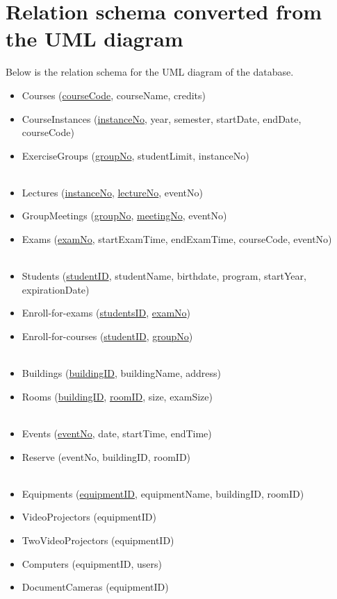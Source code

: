 \documentclass{article}
\begin{document}
\section{Relation schema converted from the UML diagram}
Below is the relation schema for the UML diagram of the database.
\begin{itemize}
	\item Courses (\underline{courseCode}, courseName, credits)
	\item CourseInstances (\underline{instanceNo}, year, semester, startDate, endDate, courseCode)
	\item ExerciseGroups (\underline{groupNo}, studentLimit, instanceNo)
	\\\\
	\item Lectures (\underline{instanceNo}, \underline{lectureNo}, eventNo)
	\item GroupMeetings (\underline{groupNo}, \underline{meetingNo}, eventNo)
	\item Exams (\underline{examNo}, startExamTime, endExamTime, courseCode, eventNo)
	\\\\
	\item Students (\underline{studentID}, studentName, birthdate, program, startYear, expirationDate)
	\item Enroll-for-exams (\underline{studentsID}, \underline{examNo})
	\item Enroll-for-courses (\underline{studentID}, \underline{groupNo})
	\\\\
	\item Buildings (\underline{buildingID}, buildingName, address)
	\item Rooms (\underline{buildingID}, \underline{roomID}, size, examSize)
	\\\\
	\item Events (\underline{eventNo}, date, startTime, endTime)
	\item Reserve (eventNo, buildingID, roomID)
	\\\\
	\item Equipments (\underline{equipmentID}, equipmentName, buildingID, roomID)
	\item VideoProjectors (equipmentID)
	\item TwoVideoProjectors (equipmentID)
	\item Computers (equipmentID, users)
	\item DocumentCameras (equipmentID)
\end{itemize}
\end{document}
